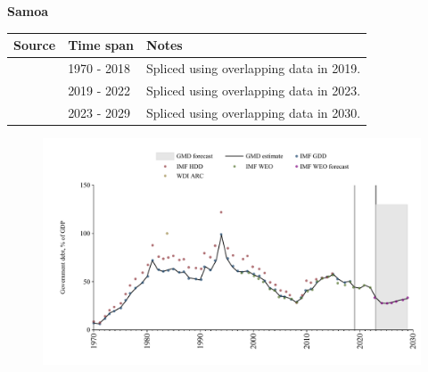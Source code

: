 \documentclass[12pt,a4paper,landscape]{article}
\begin{document}
\begin{adjustbox}{max totalsize={\paperwidth}{\paperheight},center}
\begin{minipage}[t][\textheight][t]{\textwidth}
\vspace*{0.5cm}
{}
\begin{center}
{\Large\bfseries Samoa}
\end{center}
\vspace{0.5cm}
\begin{table}[H]
\centering
\small
\begin{tabular}{|l|l|l|}
\hline
\textbf{Source} & \textbf{Time span} & \textbf{Notes} \\
\hline
\rowcolor{white}\cite{IMF_GDD}& 1970 - 2018 &Spliced using overlapping data in 2019.\\
\rowcolor{lightgray}\cite{IMF_WEO}& 2019 - 2022 &Spliced using overlapping data in 2023.\\
\rowcolor{white}\cite{IMF_WEO_forecast}& 2023 - 2029 &Spliced using overlapping data in 2030.\\
\hline
\end{tabular}
\end{table}
\begin{figure}[H]
\centering
\includegraphics[width=\textwidth,height=0.6\textheight,keepaspectratio]{graphs/WSM_govdebt_GDP.pdf}
\end{figure}
\end{minipage}
\end{adjustbox}
\end{document}
